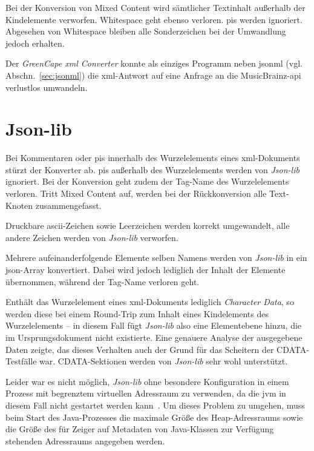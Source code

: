 Bei der Konversion von Mixed Content wird sämtlicher Textinhalt außerhalb der Kindelemente verworfen. Whitespace geht ebenso verloren. \glspl{pi} werden ignoriert. Abgesehen von Whitespace bleiben alle Sonderzeichen bei der Umwandlung jedoch erhalten.

Der \emph{GreenCape \acrshort{xml} Converter} konnte als einziges Programm neben \acrshort{jsonml} (vgl. Abschn.~\ref{sec:jsonml}) die \acrshort{xml}-Antwort auf eine Anfrage an die MusicBrainz-\acrshort{api} verlustlos umwandeln.

\section{Json-lib}
\label{sec:jsonlib}

Bei Kommentaren oder \glspl{pi} innerhalb des Wurzelelements eines \acrshort{xml}-Dokuments stürzt der Konverter ab. \glspl{pi} außerhalb des Wurzelelements werden von \emph{Json-lib} ignoriert. Bei der Konversion geht zudem der Tag-Name des Wurzelelements verloren. Tritt Mixed Content auf, werden bei der Rückkonversion alle Text-Knoten zusammengefasst.

Druckbare \acrshort{ascii}-Zeichen sowie Leerzeichen werden korrekt umgewandelt, alle andere Zeichen werden von \emph{Json-lib} verworfen.

Mehrere aufeinanderfolgende Elemente selben Namens werden von \emph{Json-lib} in ein \acrshort{json}-Array konvertiert. Dabei wird jedoch lediglich der Inhalt der Elemente übernommen, während der Tag-Name verloren geht.

Enthält das Wurzelelement eines \acrshort{xml}-Dokuments lediglich \emph{Character Data}, so werden diese bei einem Round-Trip zum Inhalt eines Kindelements des Wurzelelements -- in diesem Fall fügt \emph{Json-lib} also eine Elementebene hinzu, die im Ursprungsdokument nicht existierte. Eine genauere Analyse der ausgegebene Daten zeigte, das dieses Verhalten auch der Grund für das Scheitern der CDATA-Testfälle war. CDATA-Sektionen werden von \emph{Json-lib} sehr wohl unterstützt.

Leider war es nicht möglich, \emph{Json-lib} ohne besondere Konfiguration in einem Prozess mit begrenztem virtuellen Adressraum zu verwenden, da die \acrfull{jvm} in diesem Fall nicht gestartet werden kann~\cite{jvmmemlimit}. Um dieses Problem zu umgehen, muss beim Start des Java-Prozesses die maximale Größe des Heap-Adressraums sowie die Größe des für Zeiger auf Metadaten von Java-Klassen zur Verfügung stehenden Adressraums angegeben werden.

